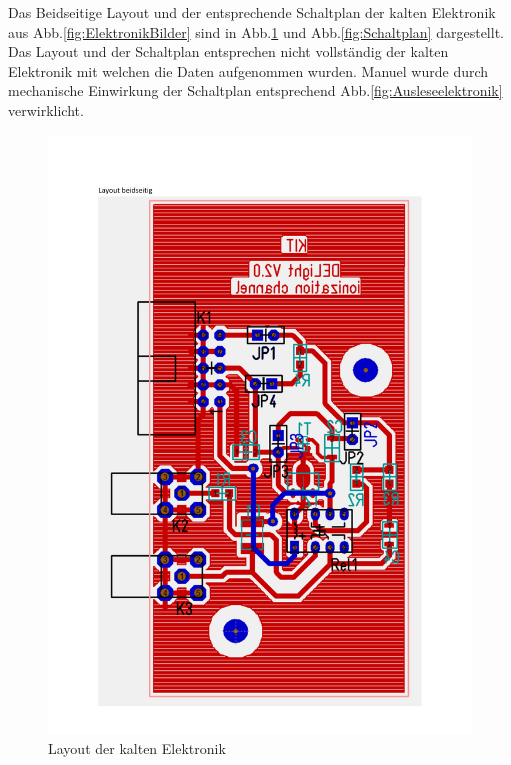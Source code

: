 Das Beidseitige Layout und der entsprechende Schaltplan der kalten Elektronik aus Abb.\ref{fig:ElektronikBilder} sind in Abb.\ref{fig:Layout} und Abb.\ref{fig:Schaltplan} dargestellt.
Das Layout und der Schaltplan entsprechen nicht vollständig der kalten Elektronik mit welchen die Daten aufgenommen wurden.
Manuel wurde durch mechanische Einwirkung der Schaltplan entsprechend Abb.\ref{fig:Ausleseelektronik} verwirklicht.

\begin{figure}[!b]
\begin{center}
\includegraphics[page=1,width=\textwidth]{./fig/SchaltplanLayoutV2.pdf}
\vspace{-0.5cm}
\caption{Layout der kalten Elektronik}
\label{fig:Layout}
\end{center}
\end{figure}

